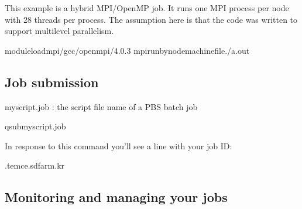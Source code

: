 \documentclass[a4paper,10pt,english]{sphinxmanual}
\begin{document}
\subsubsection{}
\label{\detokenize{guide:parallel-job-with-mpi-and-openmp}}
\sphinxAtStartPar
This example is a hybrid MPI/OpenMP job. It runs one MPI process per node with 28 threads per process. The assumption here is that the code was written to support multi\sphinxhyphen{}level parallelism.

\begin{sphinxVerbatim}[commandchars=\\\{\}]

moduleloadmpi/gcc/openmpi/4.0.3
mpirun\PYGZhy{}\PYGZhy{}bynode\PYGZhy{}machinefile./a.out
\end{sphinxVerbatim}


\subsection{Job submission}
\label{\detokenize{guide:job-submission}}
\sphinxAtStartPar
myscript.job : the script file name of a PBS batch job

\begin{sphinxVerbatim}[commandchars=\\\{\}]
\PYGZdl{}\PYGZgt{}qsubmyscript.job
\end{sphinxVerbatim}

\sphinxAtStartPar
In response to this command you’ll see a line with your job ID:

\begin{sphinxVerbatim}[commandchars=\\\{\}]
.tem\PYGZhy{}ce.sdfarm.kr
\end{sphinxVerbatim}


\subsection{Monitoring and managing your jobs}
\label{\detokenize{guide:monitoring-and-managing-your-jobs}}
\end{document}
